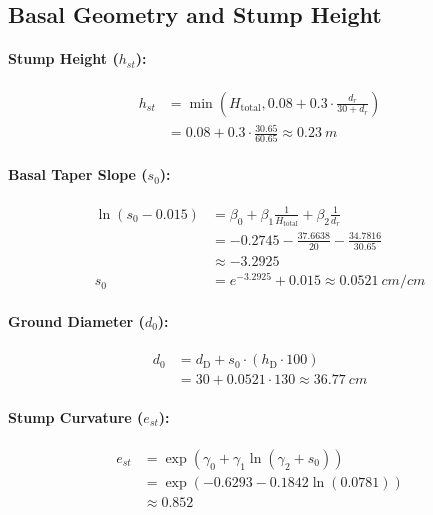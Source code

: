 \documentclass[twocolumn, bibliography=totoc]{scrartcl}
\begin{document}
\subsection{Basal Geometry and Stump Height}

\paragraph{Stump Height ($h_{st}$):}
\begin{equation}
\begin{aligned}
  h_{st} &= \min\left(H_{\text{total}}, 0.08 + 0.3 \cdot \frac{d_r}{30 + d_r}\right)\\
  &= 0.08 + 0.3 \cdot \frac{30.65}{60.65} \approx \qty{0.23}{m}
\end{aligned}
\end{equation}

\paragraph{Basal Taper Slope ($s_0$):}
\begin{equation}
\begin{aligned}
    \ln(s_0 - 0.015) &= \beta_0 + \beta_1 \frac{1}{H_{\text{total}}} + \beta_2 \frac{1}{d_r} \\
    &= -0.2745 - \frac{37.6638}{20} - \frac{34.7816}{30.65} \\
    &\approx -3.2925 \\
    s_0 &= e^{-3.2925} + 0.015 \approx \qty{0.0521}{cm/cm}
\end{aligned}
\end{equation}

\paragraph{Ground Diameter ($d_0$):}
\begin{equation}
\begin{aligned}
    d_0 &= d_{\text{D}} + s_0 \cdot (h_{\text{D}} \cdot 100) \\
        &= 30 + 0.0521 \cdot 130 \approx \qty{36.77}{cm}
\end{aligned}
\end{equation}

\paragraph{Stump Curvature ($e_{st}$):}
\begin{equation}
\begin{aligned}
    e_{st} &= \exp\left(\gamma_0 + \gamma_1 \ln(\gamma_2 + s_0)\right) \\
    &= \exp(-0.6293 - 0.1842 \ln(0.0781)) \\
    &\approx 0.852
\end{aligned}
\end{equation}
\end{document}
